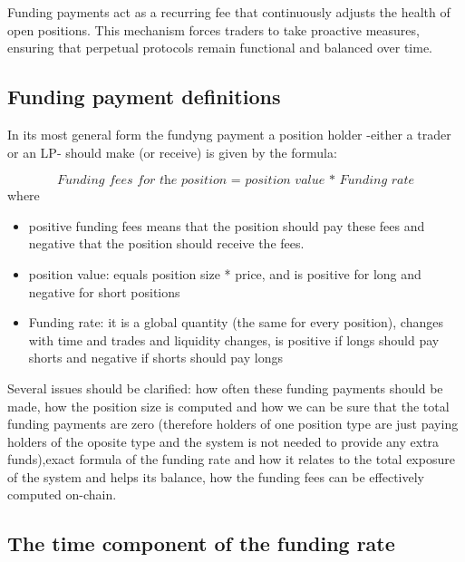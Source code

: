 \documentclass{article}
\begin{document}
Funding payments act as a recurring fee that continuously adjusts the health of open positions. This mechanism forces traders to take proactive measures, ensuring that perpetual protocols remain functional and balanced over time.


\subsection{Funding payment definitions}

In its most general form the fundyng payment a position holder -either a trader or an LP- should make (or receive) is given by the formula:

\begin{equation}
\textit{Funding fees for the position = position value * Funding rate}
\end{equation}
where 

\begin{itemize}
\item positive funding fees means that the position should pay these fees and negative that the position should receive the fees.
\item position value: equals position size * price, and is positive for long and negative for short positions
\item Funding rate: it is a global quantity (the same for every position), changes with time and trades and liquidity changes, is positive if longs should pay shorts and negative if shorts should pay longs
\end{itemize}

Several issues should be clarified: how often these funding payments should be made, how the position size is computed and how we can be sure that the total funding payments are zero (therefore holders of one position type are just paying holders of the oposite type and the system is not needed to provide any extra funds),exact formula of the funding rate and how it relates to the total exposure of the system and helps its balance, how the funding fees can be effectively computed on-chain.


\subsection{The time component of the funding rate}
\end{document}
